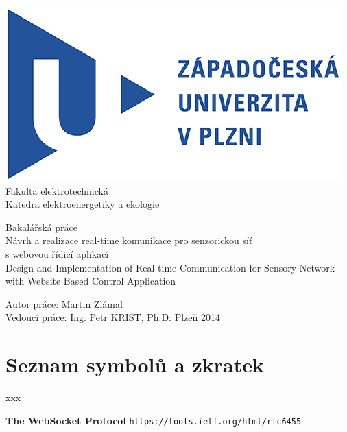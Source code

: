 \documentclass[oneside,12pt,a4paper]{book} %
\begin{document}
\pagestyle{empty}
\begin{titlepage}
\noindent
\includegraphics[scale=1]{zcu.png} \\[0.3cm]
Fakulta elektrotechnická \\
Katedra elektroenergetiky a ekologie
\vspace{5cm}
\begin{center}
	{\Huge\sc Bakalářská práce} \\
	\vspace{1cm}
	{\large Návrh a realizace real-time komunikace pro senzorickou síť\\s webovou řídicí aplikací\\}
	\vspace{1cm}
	{\large Design and Implementation of Real-time Communication for Sensory Network with Website Based Control Application}
\end{center}
\vfill
Autor práce: Martin Zlámal\\
Vedoucí práce: Ing. Petr KRIST, Ph.D. \hfill Plzeň 2014
\end{titlepage}

%



%
\tableofcontents
\cleardoublepage
\chapter*{Seznam symbolů a zkratek}
xxx








\begin{thebibliography}{9}
 {\bf The WebSocket Protocol} \texttt{https://tools.ietf.org/html/rfc6455}
\end{thebibliography}
\end{document}

